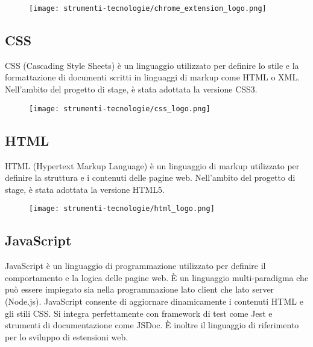 \begin{figure}[H]
    \centering 
    \texttt{[image: strumenti-tecnologie/chrome\_extension\_logo.png]} 
\end{figure}

\subsection*{CSS}

\par CSS (Cascading Style Sheets) è un linguaggio utilizzato per definire lo stile e la formattazione di documenti scritti in linguaggi di markup come HTML o XML. Nell’ambito del progetto di stage, è stata adottata la versione CSS3.

\begin{figure}[H]
    \centering 
    \texttt{[image: strumenti-tecnologie/css\_logo.png]} 
\end{figure}

\subsection*{HTML}

\par HTML (Hypertext Markup Language) è un linguaggio di markup utilizzato per definire la struttura e i contenuti delle pagine web. Nell’ambito del progetto di stage, è stata adottata la versione HTML5.

\begin{figure}[H]
    \centering 
    \texttt{[image: strumenti-tecnologie/html\_logo.png]} 
\end{figure}

\subsection*{JavaScript}

\par JavaScript è un linguaggio di programmazione utilizzato per definire il comportamento e la logica delle pagine web. È un linguaggio multi-paradigma che può essere impiegato sia nella programmazione lato client che lato server (Node.js). JavaScript consente di aggiornare dinamicamente i contenuti HTML e gli stili CSS. Si integra perfettamente con framework di test come Jest e strumenti di documentazione come JSDoc. È inoltre il linguaggio di riferimento per lo sviluppo di estensioni web.

